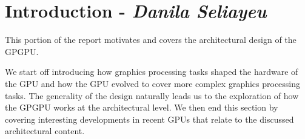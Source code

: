 \chapter{Introduction - \textit{Danila Seliayeu}}

This portion of the report motivates and covers the architectural design of the GPGPU.

We start off introducing how graphics processing tasks shaped the hardware of the GPU and how the GPU evolved to cover more complex graphics processing tasks.
The generality of the design naturally leads us to the exploration of how the GPGPU works at the architectural level.
We then end this section by covering interesting developments in recent GPUs that relate to the discussed architectural content.
